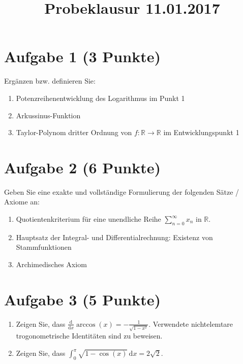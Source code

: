 \documentclass[a4paper]{article}
\title{Probeklausur 11.01.2017}
\date{}
\author{}
\newcommand*{\R}{\mathbb R}
\newcommand*{\dx}{\,\mathrm{d}x}
\begin{document}
\maketitle

\section{Aufgabe 1 (3 Punkte)}

Ergänzen bzw. definieren Sie:

\begin{enumerate}
  \item Potenzreihenentwicklung des Logarithmus im Punkt 1 %
  \item Arkussinus-Funktion %
  \item Taylor-Polynom dritter Ordnung von $f:\R\to\R$ im Entwicklungspunkt 1 %
\end{enumerate}

\section{Aufgabe 2 (6 Punkte)}

Geben Sie eine exakte und vollständige Formulierung der folgenden Sätze / Axiome an:

\begin{enumerate}
  \item Quotientenkriterium für eine unendliche Reihe $\sum_{n=0}^\infty x_n$ in $\R$. %
  \item Hauptsatz der Integral- und Differentialrechnung: Existenz von Stammfunktionen %
  \item Archimedisches Axiom
\end{enumerate}

\section{Aufgabe 3 (5 Punkte)} %

\begin{enumerate}
  \item Zeigen Sie, dass $\frac{\mathrm d}{\mathrm dx} \operatorname{arccos}(x) = -\frac{1}{\sqrt{1-x^2}}$. Verwendete nichtelemtare trogonometrische Identitäten sind zu beweisen. %
  \item Zeigen Sie, dass $\int_0^\pi \sqrt{1-\cos(x)} \dx = 2\sqrt 2$. %
\end{enumerate}
\end{document}
